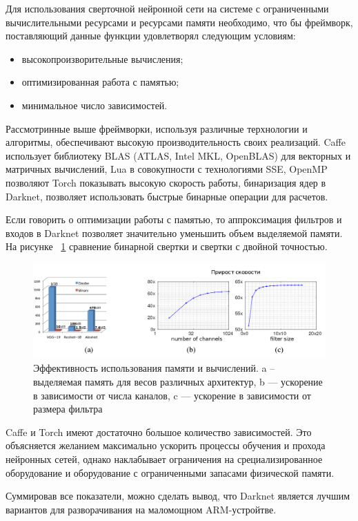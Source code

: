 \documentclass[a4paper,english,russian]{G2-105}
\begin{document}
\ttl
{}
Для использования сверточной нейронной сети на системе с ограниченными вычислительными ресурсами и ресурсами памяти необходимо, что бы фреймворк, поставляющий данные функции удовлетворял следующим условиям:
\begin{itemize}
\item высокопроизворительные вычисления;
\item оптимизированная работа с памятью;
\item минимальное число зависимостей.
\end{itemize}
\par Рассмотринные выше фреймворки, используя различные терхнологии и алгоритмы, обеспечивают высокую производительность своих реализаций. Caffe использует библиотеку BLAS (ATLAS, Intel MKL, OpenBLAS) для векторных и матричных вычислений, Lua в совокупности с технологиями SSE, OpenMP позволяют Torch показывать высокую скорость работы, бинаризация ядер в Darknet, позволяет использовать быстрые бинарные операции для расчетов.
\par Если говорить о оптимизации работы с памятью, то аппроксимация фильтров и входов в Darknet позволяет значительно уменьшить объем выделяемой памяти. На рисунке ~\ref{binary_conv} сравнение бинарной свертки и свертки с двойной точностью.
\begin{figure}
\begin{center}
    \includegraphics[width=0.55\paperheight]{binary_conv.png}
    \caption{Эффективность использования памяти и вычислений. a -- выделяемая память для весов различных архитектур, b --- ускорение в зависимости от числа каналов, c --- ускорение в зависимости от размера фильтра}
	\label{binary_conv}
\end{center}
\end{figure}
\par Caffe и Torch имеют достаточно большое количество зависимостей. Это объясняется желанием максимально ускорить процессы обучения и прохода нейронных сетей, однако наклабывает ограничения на срециализированное оборудование и оборудование с ограниченными запасами физической памяти.
\par Суммировав все показатели, можно сделать вывод, что Darknet является лучшим вариантов для разворачивания на маломощном ARM-устройтве.
\end{document}
